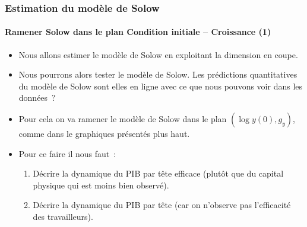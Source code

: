 \documentclass[10pt,notheorems]{beamer}
\theoremstyle{plain}
\theoremstyle{definition} %
\begin{document}
\begin{frame}
  \frametitle{Estimation du modèle de Solow}
  \framesubtitle{Ramener Solow dans le plan Condition initiale -- Croissance (1)}

  \begin{itemize}

  \item Nous allons estimer le modèle de Solow en exploitant la dimension en coupe.\newline

  \item Nous pourrons alors tester le modèle de Solow. Les prédictions quantitatives du modèle de Solow sont elles en ligne avec ce que nous pouvons voir dans les données~?\newline

  \item Pour cela on va ramener le modèle de Solow dans le plan $(\log y(0), g_y)$, comme dans le graphiques présentés plus haut.\newline

  \item Pour ce faire il nous faut~:\newline
    \begin{enumerate}
    \item Décrire la dynamique du PIB par tête efficace (plutôt que du capital physique qui est moins bien observé).\newline
    \item Décrire la dynamique du PIB par tête (car on n'observe pas l'efficacité des travailleurs).
    \end{enumerate}

  \end{itemize}

\end{frame}
\end{document}

